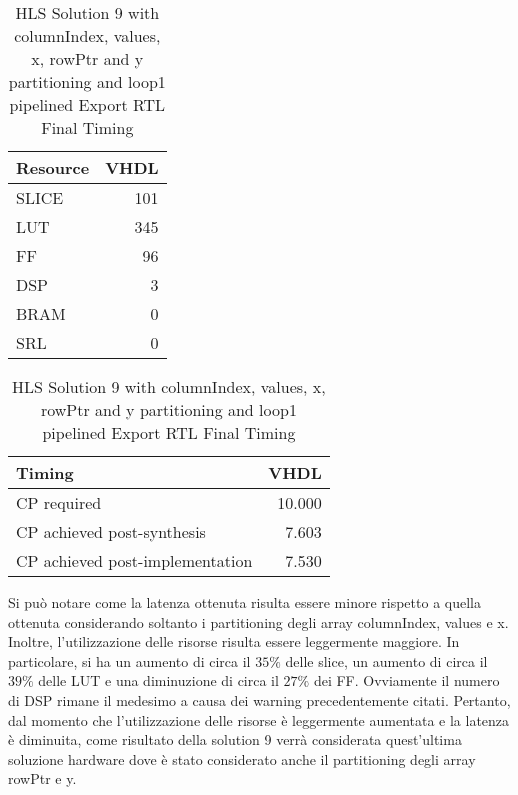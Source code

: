 \begin{table}[H]
	\centering
	\begin{minipage}[t]{0.45\linewidth}
		\centering
		\begin{tabular}{|l|r|}
			\hline
			\textbf{Resource} & \textbf{VHDL} \\
			\hline
			SLICE & 101 \\
			\hline
			LUT & 345 \\
			\hline
			FF & 96 \\
			\hline
			DSP & 3 \\
			\hline
			BRAM & 0 \\
			\hline
			SRL & 0 \\
			\hline
		\end{tabular}
		\caption{HLS Solution 9 with columnIndex, values, x, rowPtr and y partitioning and loop1 pipelined Export RTL Resource Usage}
		\label{tab:hls-solution-7-loop1-pipeline-export-rtl-resoruce-usage}
	\end{minipage}
	\hfill
	\begin{minipage}[t]{0.45\linewidth}
		\centering
		\begin{tabular}{|l|r|}
			\hline
			\textbf{Timing} & \textbf{VHDL} \\
			\hline
			CP required & 10.000 \\
			\hline
			CP achieved post-synthesis & 7.603 \\
			\hline
			CP achieved post-implementation & 7.530 \\
			\hline
		\end{tabular}
		\caption{HLS Solution 9 with columnIndex, values, x, rowPtr and y partitioning and loop1 pipelined Export RTL Final Timing}
		\label{tab:hls-solution-9-loop1-pipeline-export-rtl-final-timing}
	\end{minipage}
\end{table}

Si può notare come la latenza ottenuta risulta essere minore rispetto a quella ottenuta considerando soltanto i partitioning degli array columnIndex, values e x. Inoltre, l'utilizzazione delle risorse risulta essere leggermente maggiore. In particolare, si ha un aumento di circa il $35\%$ delle slice, un aumento di circa il $39\%$ delle LUT e una diminuzione di circa il $27\%$ dei FF. Ovviamente il numero di DSP rimane il medesimo a causa dei warning precedentemente citati. Pertanto, dal momento che l'utilizzazione delle risorse è leggermente aumentata e la latenza è diminuita, come risultato della solution 9 verrà considerata quest'ultima soluzione hardware dove è stato considerato anche il partitioning degli array rowPtr e y.
